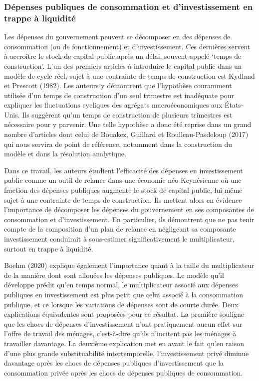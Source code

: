 \documentclass[12pt,letterpaper]{article}
\begin{document}
\subsubsection{Dépenses publiques de consommation et d'investissement en trappe à liquidité}

Les dépenses du gouvernement peuvent se décomposer en des dépenses de consommation (ou de fonctionnement) et d’investissement. Ces dernières servent à accroître le stock de capital public après un délai, souvent appelé ‘temps de construction’. L’un des premiers articles à introduire le capital public dans un modèle de cycle réel, sujet à une contrainte de temps de construction est Kydland et Prescott (1982). Les auteurs y démontrent que l’hypothèse couramment utilisée d’un temps de construction d’un seul trimestre est inadéquate pour expliquer les fluctuations cycliques des agrégats macroéconomiques aux États-Unis. Ils suggèrent qu’un temps de construction de plusieurs trimestres est nécessaire pour y parvenir. Une telle hypothèse a donc été reprise dans un grand nombre d’articles dont celui de Bouakez, Guillard et Roulleau-Pasdeloup (2017) qui nous servira de point de référence, notamment dans la construction du modèle et dans la résolution analytique.

Dans ce travail, les auteurs étudient l’efficacité des dépenses en investissement public comme un outil de relance dans une économie néo-Keynésienne où une fraction des dépenses publiques augmente le stock de capital public, lui-même sujet à une contrainte de temps de construction. Ils mettent alors en évidence l’importance de décomposer les dépenses du gouvernement en ses composantes de consommation et d’investissement. En particulier, ils démontrent que ne pas tenir compte de la composition d’un plan de relance en négligeant sa composante investissement conduirait à sous-estimer significativement le multiplicateur, surtout en trappe à liquidité.

Boehm (2020) explique également l’importance quant à la taille du multiplicateur de la manière dont sont allouées les dépenses publiques. Le modèle qu’il développe prédit qu’en temps normal, le multiplicateur associé aux dépenses publiques en investissement est plus petit que celui associé à la consommation publique, et ce lorsque les variations de dépenses sont de courte durée. Deux explications équivalentes sont proposées pour ce résultat. La première souligne que les chocs de dépenses d'investissement n'ont pratiquement aucun effet sur l'offre de travail des ménages, c'est-à-dire qu'ils n'incitent pas les ménages à travailler davantage. La deuxième explication met en avant le fait qu’en raison d'une plus grande substituabilité intertemporelle, l'investissement privé diminue davantage après les chocs de dépenses publiques d'investissement que la consommation privée après les chocs de dépenses publiques de consommation.
\end{document}
